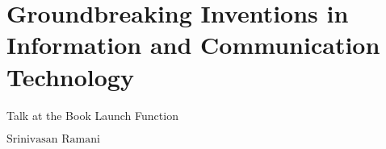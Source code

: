 \chapter{Groundbreaking Inventions in Information and Communication Technology}

\vskip -12pt

\centerline{{\LARGE Talk at the Book Launch Function}}

\vskip 0.8cm

\begin{center}
{\large\uppercase{$\text{Srinivasan Ramani}$}} 


\vskip -6pt

\end{center}

\vskip 2cm




\vfill




\newpage

\begin{multicols}{2}



\end{multicols}
